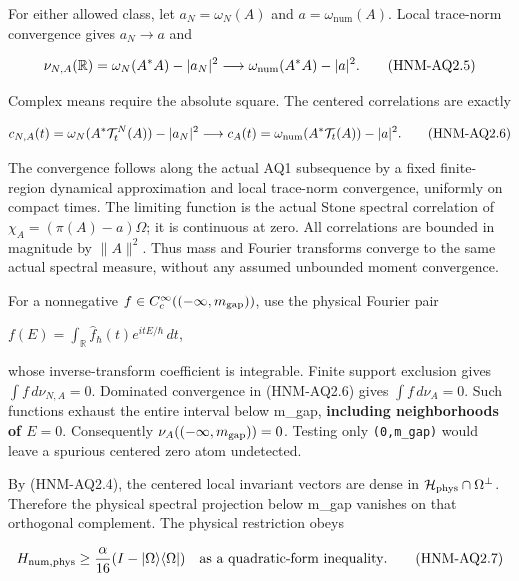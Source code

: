 For either allowed class, let \(a_N=\omega_N(A)\) and \(a=\omega_{\mathrm{num}}(A)\). Local trace-norm convergence gives \(a_N \to  a\) and

\begin{equation}
\nu_{N,A}(\mathbb R)=\omega_N(A^*A)-|a_N|^2
\longrightarrow\omega_{\rm num}(A^*A)-|a|^2.\tag{HNM-AQ2.5}
\label{r29:aq2:eq5}
\end{equation}

Complex means require the absolute square. The centered correlations are exactly

\begin{equation}
c_{N,A}(t)=\omega_N(A^*\mathcal T_t^N(A))-|a_N|^2
\longrightarrow c_A(t)=\omega_{\rm num}(A^*\mathcal T_t(A))-|a|^2.
\tag{HNM-AQ2.6}
\label{r29:aq2:eq6}
\end{equation}

The convergence follows along the actual AQ1 subsequence by a fixed finite-region dynamical approximation and local trace-norm convergence, uniformly on compact times. The limiting function is the actual Stone spectral correlation of \(\chi_A=(\pi(A)-a)\Omega\); it is continuous at zero. All correlations are bounded in magnitude by \(\|A\|^{2}\). Thus mass and Fourier transforms converge to the same actual spectral measure, without any assumed unbounded moment convergence.

For a nonnegative \(f\in C_c^\infty(({-\infty},m_{\rm gap}))\), use the physical Fourier pair

\(f(E)=\int_{\mathbb R}\widehat f_\hbar(t)e^{itE/\hbar}\,dt\),

whose inverse-transform coefficient is integrable. Finite support exclusion gives \(\int f\,d\nu_{N,A}=0\). Dominated convergence in (HNM-AQ2.6) gives \(\int f\,d\nu_A=0\). Such functions exhaust the entire interval below m\_gap, \textbf{including neighborhoods of \(E=0\)}. Consequently \(\nu_A(({-\infty},m_{\rm gap}))=0\). Testing only \texttt{(0,m\_gap)} would leave a spurious centered zero atom undetected.

By (HNM-AQ2.4), the centered local invariant vectors are dense in \(\mathcal H_{\rm phys}\cap\Omega^\perp\). Therefore the physical spectral projection below m\_gap vanishes on that orthogonal complement. The physical restriction obeys

\begin{equation}
H_{\rm num,phys}\ge {\alpha\over16}(I-|\Omega\rangle\langle\Omega|)
\quad\text{as a quadratic-form inequality}.\tag{HNM-AQ2.7}
\label{r29:aq2:eq7}
\end{equation}

